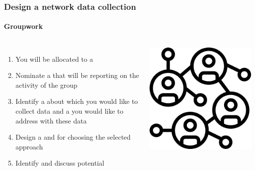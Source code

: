 \documentclass[8pt]{beamer}
\begin{document}
\begin{frame}
\frametitle{Design a network data collection}
\framesubtitle{Groupwork}

\begin{columns}[c]

\begin{enumerate}
	\item You will be allocated to a {\color{blue}{group}}
	\item Nominate a {\color{blue}{group leader}} that will be reporting on the activity of the group
	\item Identify a {\color{blue}{network}} about which you would like to collect data and a {\color{blue}{question}} you would like to address with these data
	\item Design a {\color{blue}{data collection approach}} and {\color{blue}{provide a rationale}} for choosing the selected approach
	\item Identify and discuss potential {\color{blue}{challenges}}
\end{enumerate}

\centering
\includegraphics[width=0.8\linewidth]{group_work_team.png}

\end{columns}

\end{frame}

\end{document}
